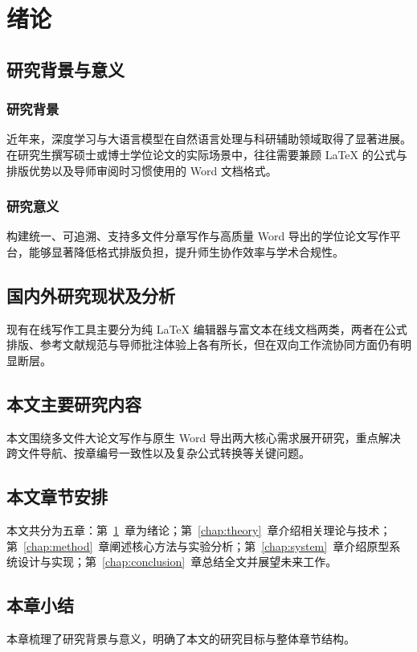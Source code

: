 \chapter{绪\quad 论}
\label{chap:intro}

\section{研究背景与意义}
\subsection{研究背景}
近年来，深度学习与大语言模型在自然语言处理与科研辅助领域取得了显著进展\cite{vaswani2017attention,devlin2019bert}。在研究生撰写硕士或博士学位论文的实际场景中，往往需要兼顾 LaTeX 的公式与排版优势以及导师审阅时习惯使用的 Word 文档格式。

\subsection{研究意义}
构建统一、可追溯、支持多文件分章写作与高质量 Word 导出的学位论文写作平台，能够显著降低格式排版负担，提升师生协作效率与学术合规性。

\section{国内外研究现状及分析}
现有在线写作工具主要分为纯 LaTeX 编辑器与富文本在线文档两类\cite{he2016deep}，两者在公式排版、参考文献规范与导师批注体验上各有所长，但在双向工作流协同方面仍有明显断层。

\section{本文主要研究内容}
本文围绕多文件大论文写作与原生 Word 导出两大核心需求展开研究，重点解决跨文件导航、按章编号一致性以及复杂公式转换等关键问题。

\section{本文章节安排}
本文共分为五章：第~\ref{chap:intro}~章为绪论；第~\ref{chap:theory}~章介绍相关理论与技术；第~\ref{chap:method}~章阐述核心方法与实验分析；第~\ref{chap:system}~章介绍原型系统设计与实现；第~\ref{chap:conclusion}~章总结全文并展望未来工作。

\section{本章小结}
本章梳理了研究背景与意义，明确了本文的研究目标与整体章节结构。
